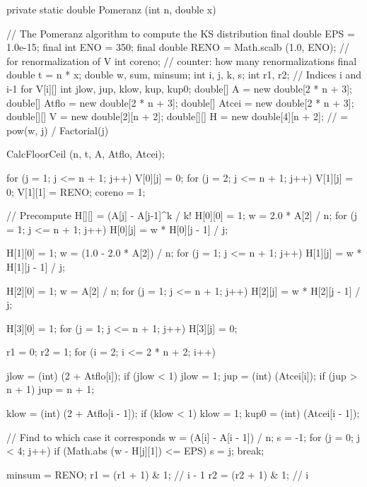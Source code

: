 \begin{code}
\begin{hide}
   private static double Pomeranz (int n, double x)
   {
      // The Pomeranz algorithm to compute the KS distribution
      final double EPS = 1.0e-15;
      final int ENO = 350;
      final double RENO = Math.scalb (1.0, ENO); // for renormalization of V
      int coreno;                    // counter: how many renormalizations
      final double t = n * x;
      double w, sum, minsum;
      int i, j, k, s;
      int r1, r2;                    // Indices i and i-1 for V[i][]
      int jlow, jup, klow, kup, kup0;
      double[] A = new double[2 * n + 3];
      double[] Atflo = new double[2 * n + 3];
      double[] Atcei = new double[2 * n + 3];
      double[][] V = new double[2][n + 2];
      double[][] H = new double[4][n + 2];     // = pow(w, j) / Factorial(j)

      CalcFloorCeil (n, t, A, Atflo, Atcei);

      for (j = 1; j <= n + 1; j++)
         V[0][j] = 0;
      for (j = 2; j <= n + 1; j++)
         V[1][j] = 0;
      V[1][1] = RENO;
      coreno = 1;

      // Precompute H[][] = (A[j] - A[j-1]^k / k!
      H[0][0] = 1;
      w = 2.0 * A[2] / n;
      for (j = 1; j <= n + 1; j++)
         H[0][j] = w * H[0][j - 1] / j;

      H[1][0] = 1;
      w = (1.0 - 2.0 * A[2]) / n;
      for (j = 1; j <= n + 1; j++)
         H[1][j] = w * H[1][j - 1] / j;

      H[2][0] = 1;
      w = A[2] / n;
      for (j = 1; j <= n + 1; j++)
         H[2][j] = w * H[2][j - 1] / j;

      H[3][0] = 1;
      for (j = 1; j <= n + 1; j++)
         H[3][j] = 0;

      r1 = 0;
      r2 = 1;
      for (i = 2; i <= 2 * n + 2; i++) {
         jlow = (int) (2 + Atflo[i]);
         if (jlow < 1)
            jlow = 1;
         jup = (int) (Atcei[i]);
         if (jup > n + 1)
            jup = n + 1;

         klow = (int) (2 + Atflo[i - 1]);
         if (klow < 1)
            klow = 1;
         kup0 = (int) (Atcei[i - 1]);

         // Find to which case it corresponds
         w = (A[i] - A[i - 1]) / n;
         s = -1;
         for (j = 0; j < 4; j++) {
            if (Math.abs (w - H[j][1]) <= EPS) {
               s = j;
               break;
            }
         }

         minsum = RENO;
         r1 = (r1 + 1) & 1;          // i - 1
         r2 = (r2 + 1) & 1;          // i

}}
\end{hide}
\end{code}
